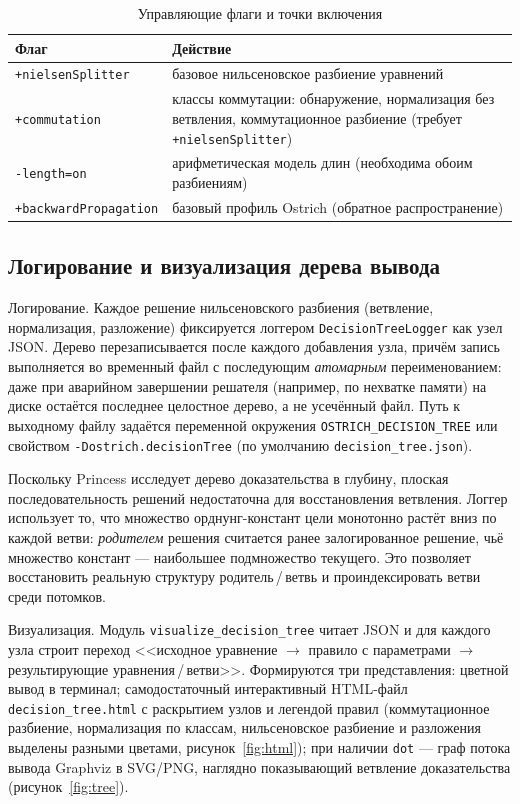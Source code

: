 \documentclass[14pt, russian]{scrartcl}
\begin{document}
\begin{table}[h!]
\caption{Управляющие флаги и точки включения}
\label{tab:flags}
\begin{tabularx}{\textwidth}{|l|X|}
\hline
Флаг & Действие \\
\hline
\verb|+nielsenSplitter| & базовое нильсеновское разбиение уравнений \\
\hline
\verb|+commutation|     & классы коммутации: обнаружение, нормализация без ветвления,
                          коммутационное разбиение (требует \verb|+nielsenSplitter|) \\
\hline
\verb|-length=on|       & арифметическая модель длин (необходима обоим разбиениям) \\
\hline
\verb|+backwardPropagation| & базовый профиль Ostrich (обратное распространение) \\
\hline
\end{tabularx}
\end{table}

\subsection{Логирование и визуализация дерева вывода}
\label{sec:viz}

Логирование. Каждое решение нильсеновского разбиения (ветвление,
нормализация, разложение) фиксируется логгером \texttt{DecisionTreeLogger} как узел
JSON. Дерево перезаписывается после каждого добавления узла, причём запись выполняется
во временный файл с последующим \textit{атомарным} переименованием: даже при аварийном
завершении решателя (например, по нехватке памяти) на диске остаётся последнее
целостное дерево, а не усечённый файл. Путь к выходному файлу задаётся переменной
окружения \texttt{OSTRICH\_DECISION\_TREE} или свойством \texttt{-Dostrich.decisionTree}
(по умолчанию \texttt{decision\_tree.json}).

Поскольку Princess исследует дерево доказательства в глубину, плоская
последовательность решений недостаточна для восстановления ветвления. Логгер
использует то, что множество орднунг-констант цели монотонно растёт вниз по каждой
ветви: \textit{родителем} решения считается ранее залогированное решение, чьё множество
констант --- наибольшее подмножество текущего. Это позволяет восстановить реальную
структуру родитель\,/\,ветвь и проиндексировать ветви среди потомков.

Визуализация. Модуль \texttt{visualize\_decision\_tree} читает JSON и для
каждого узла строит переход <<исходное уравнение $\to$ правило с параметрами $\to$
результирующие уравнения\,/\,ветви>>. Формируются три представления: цветной вывод в
терминал; самодостаточный интерактивный HTML-файл \texttt{decision\_tree.html} с
раскрытием узлов и легендой правил (коммутационное разбиение, нормализация по классам,
нильсеновское разбиение и разложения выделены разными цветами,
рисунок~\ref{fig:html}); при наличии \texttt{dot} --- граф потока вывода Graphviz в
SVG/PNG, наглядно показывающий ветвление доказательства (рисунок~\ref{fig:tree}).
\end{document}
